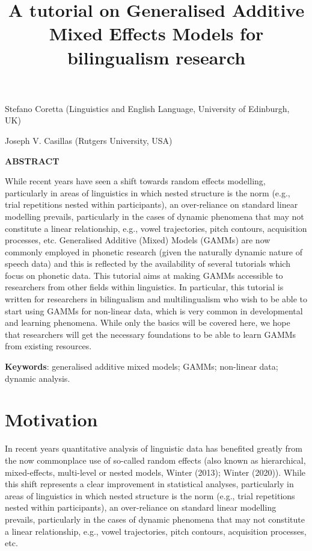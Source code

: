 \documentclass[
  letterpaper,
  DIV=11,
  numbers=noendperiod]{scrartcl}
\title{A tutorial on Generalised Additive Mixed Effects Models for
bilingualism research}
\author{}
\date{}
\begin{document}
\maketitle


Stefano Coretta (Linguistics and English Language, University of
Edinburgh, UK)

Joseph V. Casillas (Rutgers University, USA)

\textbf{ABSTRACT}

While recent years have seen a shift towards random effects modelling,
particularly in areas of linguistics in which nested structure is the
norm (e.g., trial repetitions nested within participants), an
over-reliance on standard linear modelling prevails, particularly in the
cases of dynamic phenomena that may not constitute a linear
relationship, e.g., vowel trajectories, pitch contours, acquisition
processes, etc. Generalised Additive (Mixed) Models (GAMMs) are now
commonly employed in phonetic research (given the naturally dynamic
nature of speech data) and this is reflected by the availability of
several tutorials which focus on phonetic data. This tutorial aims at
making GAMMs accessible to researchers from other fields within
linguistics. In particular, this tutorial is written for researchers in
bilingualism and multilingualism who wish to be able to start using
GAMMs for non-linear data, which is very common in developmental and
learning phenomena. While only the basics will be covered here, we hope
that researchers will get the necessary foundations to be able to learn
GAMMs from existing resources.

\textbf{Keywords}: generalised additive mixed models; GAMMs; non-linear
data; dynamic analysis.

\section{Motivation}\label{motivation}

In recent years quantitative analysis of linguistic data has benefited
greatly from the now commonplace use of so-called random effects (also
known as hierarchical, mixed-effects, multi-level or nested models,
Winter (2013); Winter (2020)). While this shift represents a clear
improvement in statistical analyses, particularly in areas of
linguistics in which nested structure is the norm (e.g., trial
repetitions nested within participants), an over-reliance on standard
linear modelling prevails, particularly in the cases of dynamic
phenomena that may not constitute a linear relationship, e.g., vowel
trajectories, pitch contours, acquisition processes, etc.
\end{document}
